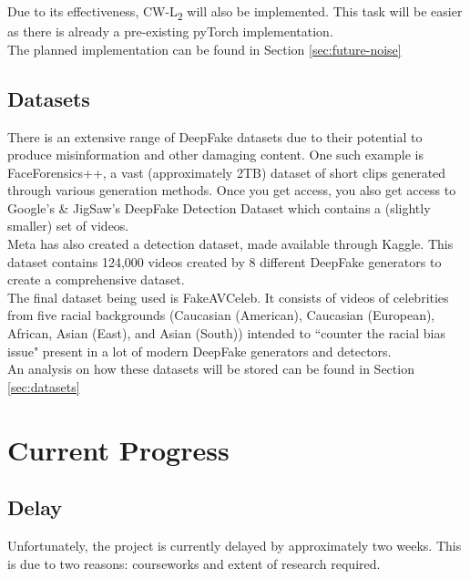 \documentclass{article}
\begin{document}
Due to its effectiveness, CW-L\textsubscript{2} will also be implemented. This task will be easier as there is already a pre-existing pyTorch implementation\cite{cwl2python}.\\

The planned implementation can be found in Section \ref{sec:future-noise}

\subsection{Datasets}

There is an extensive range of DeepFake datasets due to their potential to produce misinformation and other damaging content. One such example is FaceForensics++\cite{roessler2019faceforensicspp}, a vast (approximately 2TB) dataset of short clips generated through various generation methods. Once you get access, you also get access to Google's \& JigSaw's DeepFake Detection Dataset\cite{DDD_GoogleJigSaw2019} which contains a (slightly smaller) set of videos.\\

Meta has also created a detection dataset\cite{DFDC2020}, made available through Kaggle\cite{kagglemeta}. This dataset contains 124,000 videos created by 8 different DeepFake generators to create a comprehensive dataset.\\

The final dataset being used is FakeAVCeleb\cite{khalid2021fakeavceleb}. It consists of videos of celebrities from five racial backgrounds (Caucasian (American),  Caucasian (European), African, Asian (East), and Asian (South)) intended to ``counter the racial bias issue" present in a lot of modern DeepFake generators and detectors.\\

An analysis on how these datasets will be stored can be found in Section \ref{sec:datasets}

\section{Current Progress}

\subsection{Delay} \label{sec:delay}

Unfortunately, the project is currently delayed by approximately two weeks. This is due to two reasons: courseworks and extent of research required.
\end{document}
